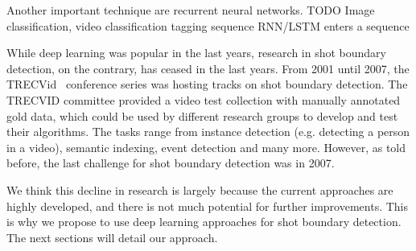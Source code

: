 Another important technique are recurrent neural networks.
TODO
Image classification, video classification
tagging sequence
RNN/LSTM
enters a sequence

While deep learning was popular in the last years, research in shot boundary detection, on the contrary, has ceased in the last years.
From 2001 until 2007, the TRECVid~\cite{trecvid} conference series was hosting tracks on shot boundary detection.
The TRECVID committee provided a video test collection with manually annotated gold data, which could be used by different research groups to develop and test their algorithms.
The tasks range from instance detection (e.g. detecting a person in a video), semantic indexing, event detection and many more.
However, as told before, the last challenge for shot boundary detection was in 2007.

We think this decline in research is largely because the current approaches are highly developed, and there is not much potential for further improvements.
This is why we propose to use deep learning approaches for shot boundary detection.
The next sections will detail our approach.

